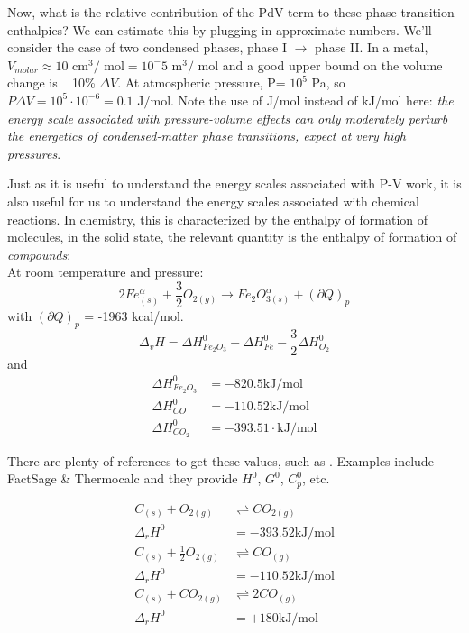 \documentclass[12pt]{article}
\begin{document}
Now, what is the relative contribution of the PdV term to these phase transition enthalpies?  We can estimate this by plugging in approximate numbers. We'll consider the case of two condensed phases, phase I $\rightarrow$ phase II.  In a metal, $V_{molar} \approx 10 \text{ cm}^3\text{/ mol}=10^-5 \text{ m}^3\text{/ mol}$ and a good upper bound on the volume change is ~ 10\% $\Delta V$.  At atmospheric pressure, P\degree = $10^5$ Pa, so $P \Delta V = 10^5 \cdot 10^{-6} = 0.1 \text{ J/mol}$. Note the use of J/mol instead of kJ/mol here: \emph{the energy scale associated with pressure-volume effects can only moderately perturb the energetics of condensed-matter phase transitions, expect at very high pressures}.

Just as it is useful to understand the energy scales associated with P-V work, it is also useful for us to understand the energy scales associated with chemical reactions. In chemistry, this is characterized by the enthalpy of formation of molecules, in the solid state, the relevant quantity is the enthalpy of formation of \emph{compounds}:\\
At room temperature and pressure:
\begin{equation}
2 Fe_{(s)}^{\alpha} + \frac{3}{2}O_{2 (g)} \rightarrow Fe_2O_{3 (s)}^{\alpha} + (\partial Q)_p
\end{equation}
with $(\partial Q)_p$ = -1963 kcal/mol.
\begin{equation}
\Delta_v H = \Delta H^0_{Fe_2O_3} - \Delta H^0_{Fe} - \frac{3}{2} \Delta H^0_{O_2}
\end{equation}
and
\begin{align*}
\Delta H^0_{Fe_2O_3} &= -820.5 \text{kJ}/\text{mol}\\
\Delta H^0_{CO} &= -110.52 \text{kJ}/\text{mol}\\
\Delta H^0_{CO_2} &= -393.51 \cdot \text{kJ}/\text{mol}
\end{align*}

There are plenty of references to get these values, such as .  Examples include FactSage \& Thermocalc and they provide $H^0$, $G^0$, $C_p^0$, etc.

\begin{align*}
C_{(s)} + O_{2 (g)} &\rightleftharpoons CO_{2 (g)}\\
\Delta_r H^0 &= -393.52 \text{kJ}/\text{mol}\\
C_{(s)} + \frac{1}{2} O_{2 (g)} &\rightleftharpoons CO_{(g)}\\
\Delta_r H^0 &= -110.52 \text{kJ}/\text{mol}\\
C_{(s)} + CO_{2 (g)} &\rightleftharpoons 2 CO_{(g)}\\
\Delta_r H^0 &= +180 \text{kJ}/\text{mol}\\
\end{align*}
\end{document}
